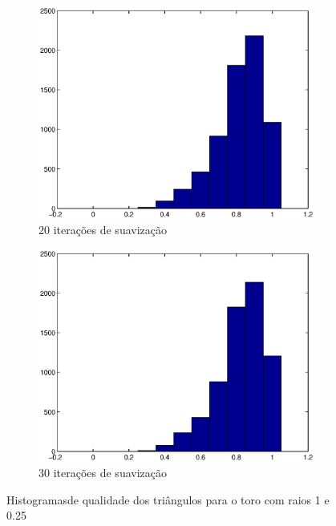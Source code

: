\documentclass[11pt]{article}
\begin{document}
\begin{figure}
\begin{subfigure}[b]{0.45\textwidth}
				\includegraphics[width=\textwidth]{figures/20iter_torus}
				\caption{20 iterações de suavização}				
			\end{subfigure}
			\begin{subfigure}[b]{0.45\textwidth}
				\centering
				\includegraphics[width=\textwidth]{figures/30iter_torus}
				\caption{30 iterações de suavização}				
			\end{subfigure}
			\caption{Histogramasde qualidade dos triângulos para o toro com raios 1 e 0.25}
			\label{fig:hist:torus}
		\end{figure}

	
	
\end{document}
